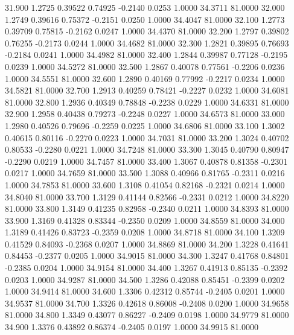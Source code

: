  31.900   1.2725   0.39522   0.74925  -0.2140   0.0253   1.0000  34.3711  81.0000
  32.000   1.2749   0.39616   0.75372  -0.2151   0.0250   1.0000  34.4047  81.0000
  32.100   1.2773   0.39709   0.75815  -0.2162   0.0247   1.0000  34.4370  81.0000
  32.200   1.2797   0.39802   0.76255  -0.2173   0.0244   1.0000  34.4682  81.0000
  32.300   1.2821   0.39895   0.76693  -0.2184   0.0241   1.0000  34.4982  81.0000
  32.400   1.2844   0.39987   0.77128  -0.2195   0.0239   1.0000  34.5272  81.0000
  32.500   1.2867   0.40078   0.77561  -0.2206   0.0236   1.0000  34.5551  81.0000
  32.600   1.2890   0.40169   0.77992  -0.2217   0.0234   1.0000  34.5821  81.0000
  32.700   1.2913   0.40259   0.78421  -0.2227   0.0232   1.0000  34.6081  81.0000
  32.800   1.2936   0.40349   0.78848  -0.2238   0.0229   1.0000  34.6331  81.0000
  32.900   1.2958   0.40438   0.79273  -0.2248   0.0227   1.0000  34.6573  81.0000
  33.000   1.2980   0.40526   0.79696  -0.2259   0.0225   1.0000  34.6806  81.0000
  33.100   1.3002   0.40615   0.80116  -0.2270   0.0223   1.0000  34.7031  81.0000
  33.200   1.3024   0.40702   0.80533  -0.2280   0.0221   1.0000  34.7248  81.0000
  33.300   1.3045   0.40790   0.80947  -0.2290   0.0219   1.0000  34.7457  81.0000
  33.400   1.3067   0.40878   0.81358  -0.2301   0.0217   1.0000  34.7659  81.0000
  33.500   1.3088   0.40966   0.81765  -0.2311   0.0216   1.0000  34.7853  81.0000
  33.600   1.3108   0.41054   0.82168  -0.2321   0.0214   1.0000  34.8040  81.0000
  33.700   1.3129   0.41144   0.82566  -0.2331   0.0212   1.0000  34.8220  81.0000
  33.800   1.3149   0.41235   0.82958  -0.2340   0.0211   1.0000  34.8393  81.0000
  33.900   1.3169   0.41328   0.83344  -0.2350   0.0209   1.0000  34.8559  81.0000
  34.000   1.3189   0.41426   0.83723  -0.2359   0.0208   1.0000  34.8718  81.0000
  34.100   1.3209   0.41529   0.84093  -0.2368   0.0207   1.0000  34.8869  81.0000
  34.200   1.3228   0.41641   0.84453  -0.2377   0.0205   1.0000  34.9015  81.0000
  34.300   1.3247   0.41768   0.84801  -0.2385   0.0204   1.0000  34.9154  81.0000
  34.400   1.3267   0.41913   0.85135  -0.2392   0.0203   1.0000  34.9287  81.0000
  34.500   1.3286   0.42088   0.85451  -0.2399   0.0202   1.0000  34.9414  81.0000
  34.600   1.3306   0.42312   0.85744  -0.2405   0.0201   1.0000  34.9537  81.0000
  34.700   1.3326   0.42618   0.86008  -0.2408   0.0200   1.0000  34.9658  81.0000
  34.800   1.3349   0.43077   0.86227  -0.2409   0.0198   1.0000  34.9779  81.0000
  34.900   1.3376   0.43892   0.86374  -0.2405   0.0197   1.0000  34.9915  81.0000
